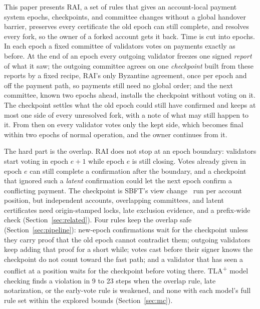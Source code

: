 This paper presents RAI, a set of rules that gives an account-local payment system epochs, checkpoints, and committee changes without a global handover barrier, preserves every certificate the old epoch can still complete, and resolves every fork, so the owner of a forked account gets it back. Time is cut into epochs. In each epoch a fixed committee of validators votes on payments exactly as before. At the end of an epoch every outgoing validator freezes one signed \emph{report} of what it saw; the outgoing committee agrees on one \emph{checkpoint} built from these reports by a fixed recipe, RAI's only Byzantine agreement, once per epoch and off the payment path, so payments still need no global order; and the next committee, known two epochs ahead, installs the checkpoint without voting on it. The checkpoint settles what the old epoch could still have confirmed and keeps at most one side of every unresolved fork, with a note of what may still happen to it. From then on every validator votes only the kept side, which becomes final within two epochs of normal operation, and the owner continues from it.

The hard part is the overlap. RAI does not stop at an epoch boundary: validators start voting in epoch $e+1$ while epoch $e$ is still closing. Votes already given in epoch $e$ can still complete a confirmation after the boundary, and a checkpoint that ignored such a \emph{latent} confirmation could let the next epoch confirm a conflicting payment. The checkpoint is SBFT's view change~\cite{gueta2019sbft} run per account position, but independent accounts, overlapping committees, and latent certificates need origin-stamped locks, late exclusion evidence, and a prefix-wide check (Section~\ref{sec:related}). Four rules keep the overlap safe (Section~\ref{sec:pipeline}): new-epoch confirmations wait for the checkpoint unless they carry proof that the old epoch cannot contradict them; outgoing validators keep adding that proof for a short while; votes cast before their signer knows the checkpoint do not count toward the fast path; and a validator that has seen a conflict at a position waits for the checkpoint before voting there. TLA\textsuperscript{+} model checking finds a violation in 9 to 23 steps when the overlap rule, late notarization, or the early-vote rule is weakened, and none with each model's full rule set within the explored bounds (Section~\ref{sec:mc}).

